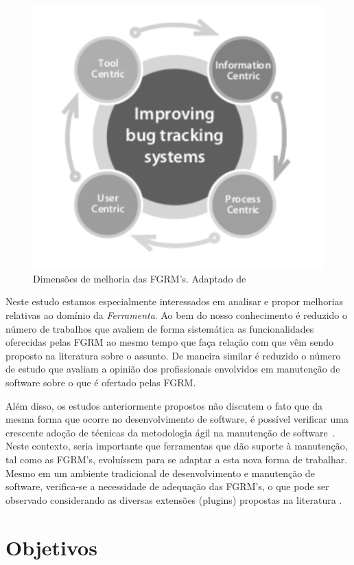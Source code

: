\begin{figure}[htpb] \centering
	\includegraphics[width=0.666666\linewidth]{chapter-intro/img/dimensoes_melhorias_fgrm.pdf}
	\caption{Dimensões de melhoria das FGRM's. Adaptado
		de~\cite{zimmermann2005mining}}\label{fig:dimensoes_melhorias_fgrm}
\end{figure}

Neste estudo estamos especialmente interessados em analisar e propor melhorias
relativas ao domínio da \textit{Ferramenta}. Ao bem do nosso conhecimento é
reduzido o número de trabalhos que avaliem de forma sistemática as
funcionalidades oferecidas pelas FGRM ao mesmo tempo que faça relação com que
vêm sendo proposto na literatura sobre o assunto. De maneira similar é reduzido
o número de estudo que avaliam a opinião dos profissionais envolvidos em
manutenção de software sobre o que é ofertado pelas FGRM\@.

Além disso, os estudos anteriormente propostos não discutem o fato que da mesma
forma que ocorre no desenvolvimento de software, é possível verificar uma
crescente adoção de técnicas da metodologia ágil na manutenção de
software~\cite{Soltan2016,Devulapally2015, Heeager2015}. Neste contexto, seria
importante que ferramentas que dão suporte à manutenção, tal como as FGRM's,
evoluíssem para se adaptar a esta nova forma de trabalhar. Mesmo em um
ambiente tradicional de  desenvolvimento e manutenção de software, verifica-se a
necessidade de adequação das FGRM's, o que pode ser observado considerando as
diversas extensões (plugins) propostas na literatura
\cite{101186,Thung:2014:BIT:2635868.2661678,Kononenko:2014:DED:2591062.2591075}.

\section{Objetivos}
\label{sec:intro-objetivos}


